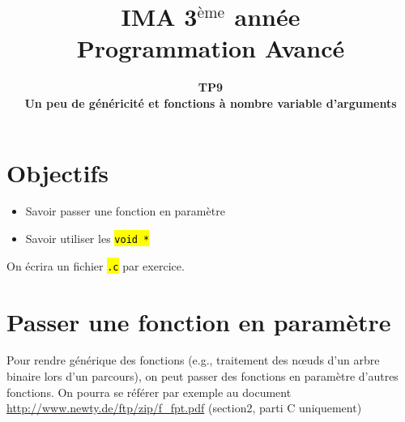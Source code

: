 \documentclass[final, a4paper, openbib, ]{article} %
\title{IMA 3$^{\mbox{\`eme}}$ année\\ Programmation Avancé
}
\author{\huge \textbf{TP9}\\
	\LARGE \textbf{Un peu de généricité et fonctions à nombre variable d'arguments}}
\date{}
\let\OldTexttt\texttt
\renewcommand{\texttt}[1]{\OldTexttt{\hl{#1}}}
\begin{document}
\posttitle{\par\end{center}}
\setlength{\droptitle}{-45pt}
\maketitle

\vspace{-1cm}
\section{Objectifs}

\begin{itemize}
	\item Savoir passer une fonction en paramètre
	\item Savoir utiliser les \texttt{void *}
\end{itemize}
On écrira un fichier \texttt{.c} par exercice.



\section{Passer une fonction en paramètre}

Pour rendre générique des fonctions (e.g., traitement des nœuds d'un arbre binaire lors d'un parcours), on peut passer des fonctions en paramètre d'autres fonctions.
On pourra se référer par exemple au document \url{http://www.newty.de/ftp/zip/f_fpt.pdf} (section2, parti C uniquement)
\end{document}
